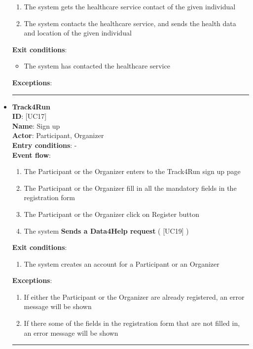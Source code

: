 \documentclass[12pt]{article}
\newcommand\usecase[1]{ [UC#1] }
\begin{document}
\begin{itemize}
\begin{enumerate}
    			\item{The system gets the healthcare service contact of the given individual}
    			\item{The system contacts the healthcare service, and sends the health data and location of the given individual}
  		\end{enumerate}
  	\textbf{Exit conditions}: 
  		\begin{itemize}
  			\item{The system has contacted the healthcare service}
  		\end{itemize}
  	\textbf{Exceptions}: \\
  	\rule{\linewidth}{0.4pt}
  	\item{\textbf{Track4Run}}\\
	\textbf{ID}: \usecase{17} \\
  	\textbf{Name}: Sign up \\
    \textbf{Actor}: Participant, Organizer \\
    \textbf{Entry conditions}: - \\
  	\textbf{Event flow}:
  		\begin{enumerate}
    			\item{The Participant or the Organizer enters to the Track4Run sign up page}
    			\item{The Participant or the Organizer fill in all the mandatory fields in the registration form}
    			\item{The Participant or the Organizer click on Register button}
    			\item{The system \textbf{Sends a Data4Help request} (\usecase{19})}
  		\end{enumerate}
  	\textbf{Exit conditions}:
  		\begin{enumerate}
    			\item{The system creates an account for a Participant or an Organizer}
  		\end{enumerate}
  	\textbf{Exceptions}: 
  		\begin{enumerate}
    			\item{If either the Participant or the Organizer are already registered, an error message will be shown}
    			\item{If there some of the fields in the registration form that are not filled in, an error message will be shown}
  		\end{enumerate}
  	\rule{\linewidth}{0.4pt}

\end{itemize}
\end{document}
